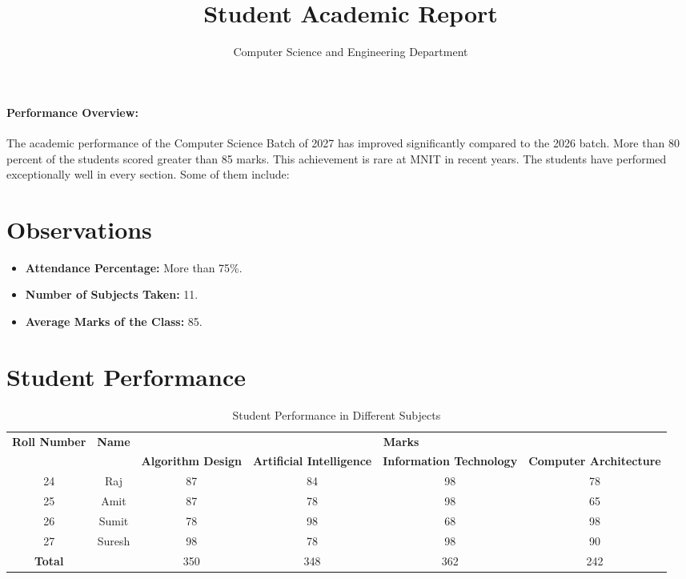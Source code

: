 \documentclass[a4paper,12pt]{article}
\title{\Large \textbf{Student Academic Report}}
\author{Computer Science and Engineering Department}
\date{}  %
\begin{document}
	
	\maketitle
	
	\paragraph*{Performance Overview:} 
	The academic performance of the Computer Science Batch of 2027 has improved significantly compared to the 2026 batch. More than 80 percent of the students scored greater than 85 marks. This achievement is rare at MNIT in recent years. The students have performed exceptionally well in every section. Some of them include:
	
	\section*{Observations}
	\begin{itemize}
		\item \textbf{Attendance Percentage:} More than 75\%.
		\item \textbf{Number of Subjects Taken:} 11.
		\item \textbf{Average Marks of the Class:} 85.
	\end{itemize}
	
	\section*{Student Performance}
	\begin{table}[h]
		\centering
		\small  %
		\begin{tabular}{|c|c|c|c|c|c|}
			\hline
			\multirow{2}{*}{\textbf{Roll Number}} & \multirow{2}{*}{\textbf{Name}} & \multicolumn{4}{|c|}{\textbf{Marks}} \\
			\cline{3-6}
			&  & \textbf{Algorithm Design} & \textbf{Artificial Intelligence} & \textbf{Information Technology} & \textbf{Computer Architecture} \\
			\hline
			24 & Raj & 87 & 84 & 98 & 78 \\
			\hline
			25 & Amit & 87 & 78 & 98 & 65 \\
			\hline
			26 & Sumit & 78 & 98 & 68 & 98 \\
			\hline
			27 & Suresh & 98 & 78 & 98 & 90 \\
			\hline
			\textbf{Total} & & 350 & 348 & 362 & 242 \\
			\hline
		\end{tabular}
		\caption{Student Performance in Different Subjects}
	\end{table}
	
\end{document}
